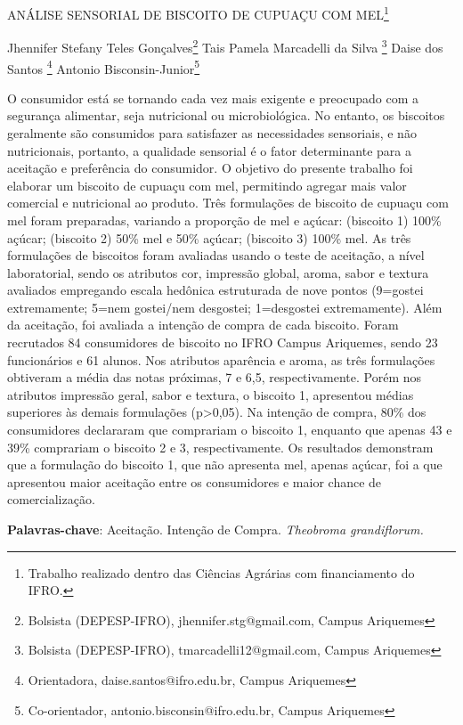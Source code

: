 \documentclass[article,12pt,onesidea,4paper,english,brazil]{abntex2}
\begin{document}
	
	
	\frenchspacing 
	
	\begin{center}
		\LARGE ANÁLISE SENSORIAL DE BISCOITO DE CUPUAÇU COM MEL\footnote{Trabalho realizado dentro das Ciências Agrárias com financiamento do IFRO.}
		
		\normalsize
		Jhennifer Stefany Teles Gonçalves\footnote{Bolsista (DEPESP-IFRO), jhennifer.stg@gmail.com, Campus Ariquemes} 
		Tais Pamela Marcadelli da Silva	\footnote{Bolsista (DEPESP-IFRO), tmarcadelli12@gmail.com, Campus Ariquemes} 
		Daise dos Santos \footnote{Orientadora, daise.santos@ifro.edu.br, Campus Ariquemes} 
		Antonio Bisconsin-Junior\footnote{Co-orientador, antonio.bisconsin@ifro.edu.br, Campus Ariquemes}
	\end{center}

\noindent O consumidor está se tornando cada vez mais exigente e preocupado com a segurança alimentar, seja nutricional ou microbiológica. No entanto, os biscoitos geralmente são consumidos para satisfazer as necessidades sensoriais, e não nutricionais, portanto, a qualidade sensorial é o fator determinante para a aceitação e preferência do consumidor. O objetivo do presente trabalho foi elaborar um  biscoito de cupuaçu com mel, permitindo agregar mais valor comercial e nutricional ao produto. Três formulações de biscoito de cupuaçu com mel foram preparadas, variando a proporção de mel e açúcar: (biscoito 1) 100\% açúcar; (biscoito 2) 50\% mel e 50\% açúcar; (biscoito 3) 100\% mel. As três formulações de biscoitos foram avaliadas usando o teste de aceitação, a nível laboratorial, sendo os atributos cor, impressão global, aroma, sabor e textura avaliados empregando escala hedônica estruturada de nove pontos (9=gostei extremamente; 5=nem gostei/nem desgostei; 1=desgostei extremamente). Além da aceitação, foi avaliada a intenção de compra de cada biscoito. Foram recrutados 84 consumidores de biscoito no IFRO Campus Ariquemes, sendo 23 funcionários e 61 alunos. Nos atributos aparência e aroma, as três formulações obtiveram a média das notas próximas, 7 e 6,5, respectivamente. Porém nos atributos impressão geral, sabor e textura, o biscoito 1, apresentou médias superiores às demais formulações (p>0,05). Na intenção de compra, 80\% dos consumidores declararam que comprariam o biscoito 1, enquanto que apenas 43 e 39\% comprariam o biscoito 2 e 3, respectivamente. Os resultados demonstram que a formulação do biscoito 1, que não apresenta mel, apenas açúcar, foi a que apresentou maior aceitação entre os consumidores e maior chance de comercialização.

\vspace{\onelineskip}

\noindent
\textbf{Palavras-chave}: Aceitação. Intenção de Compra. \textit{Theobroma grandiflorum.}
\end{document}
